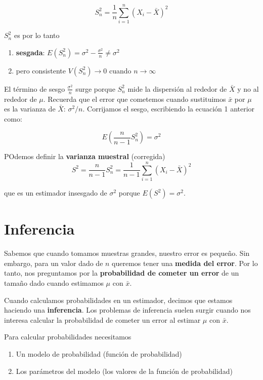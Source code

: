 \documentclass[
]{book}
\providecommand{\tightlist}{%
  \setlength{\itemsep}{0pt}\setlength{\parskip}{0pt}}
\begin{document}
\[S_n^2=\frac{1}{n}\sum_{i=1}^n (X_i-\bar{X})^2\]

\(S_n^2\) es por lo tanto

\begin{enumerate}
\def\labelenumi{\arabic{enumi})}
\tightlist
\item
  \textbf{sesgada}: \(E(S_n^2) = \sigma^2-\frac{\sigma^2}{n} \neq \sigma^2\)
\item
  pero consistente \(V(S_n^2) \rightarrow 0\) cuando \(n\rightarrow \infty\)
\end{enumerate}

El término de sesgo \(\frac{\sigma^2}{n}\) surge porque \(S_n^2\) mide la dispersión al rededor de \(\bar{X}\) y no al rededor de \(\mu\). Recuerda que el error que cometemos cuando sustituimos \(\bar{x}\) por \(\mu\) es la varianza de \(\bar{X}\): \(\sigma^2/n\). Corrijamos el sesgo, escribiendo la ecuación 1 anterior como:

\[E(\frac{n}{n-1}S_n^2)=\sigma^2\]

POdemos definir la \textbf{varianza muestral} (corregida) \[S^2=\frac{n}{n-1}S_n^2=\frac{1}{n-1}\sum_{i=1}^n (X_i-\bar{X})^2\]

que es un estimador insesgado de \(\sigma^2\) porque \(E(S^2)=\sigma^2\).

\hypertarget{inferencia}{%
\section{Inferencia}\label{inferencia}}

Sabemos que cuando tomamos muestras grandes, nuestro error es pequeño. Sin embargo, para un valor dado de \(n\) queremos tener una \textbf{medida del error}. Por lo tanto, nos preguntamos por la \textbf{probabilidad de cometer un error} de un tamaño dado cuando estimamos \(\mu\) con \(\bar{x}\).

Cuando calculamos probabilidades en un estimador, decimos que estamos haciendo una \textbf{inferencia}. Los problemas de inferencia suelen surgir cuando nos interesa calcular la probabilidad de cometer un error al estimar \(\mu\) con \(\bar{x}\).

Para calcular probabilidades necesitamos

\begin{enumerate}
\def\labelenumi{\arabic{enumi}.}
\item
  Un modelo de probabilidad (función de probabilidad)
\item
  Los parámetros del modelo (los valores de la función de probabilidad)
\end{enumerate}
\end{document}
